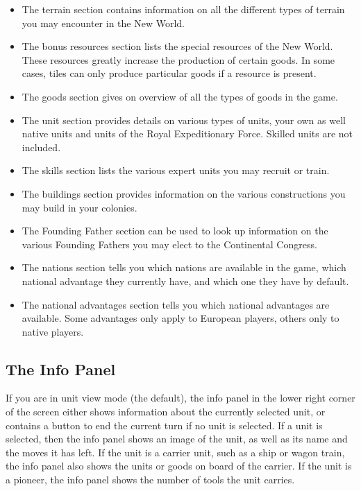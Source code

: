 \documentclass[12pt]{book}
\begin{document}
\begin{itemize}
\item The terrain section contains information on all the different
types of terrain you may encounter in the New World.
\item The bonus resources section lists the special resources of the
  New World. These resources greatly increase the production of
  certain goods. In some cases, tiles can only produce particular
  goods if a resource is present.
\item The goods section gives on overview of all the types of goods in
the game.
\item The unit section provides details on various types of units,
  your own as well native units and units of the Royal Expeditionary
  Force. Skilled units are not included.
\item The skills section lists the various expert units you may
  recruit or train.
\item The buildings section provides information on the various
constructions you may build in your colonies.
\item The Founding Father section can be used to look up information
on the various Founding Fathers you may elect to the Continental
Congress.
\item The nations section tells you which nations are available in the
  game, which national advantage they currently have, and which one
  they have by default.
\item The national advantages section tells you which national
  advantages are available. Some advantages only apply to European
  players, others only to native players.
\end{itemize}


\hypertarget{info panel}{\subsection{The Info Panel}}

If you are in unit view mode (the default), the info panel in the
lower right corner of the screen either shows information about the
currently selected unit, or contains a button to end the current turn
if no unit is selected. If a unit is selected, then the info panel
shows an image of the unit, as well as its name and the moves it has
left. If the unit is a carrier unit, such as a ship or wagon train,
the info panel also shows the units or goods on board of the
carrier. If the unit is a pioneer, the info panel shows the number of
tools the unit carries.
\end{document}
